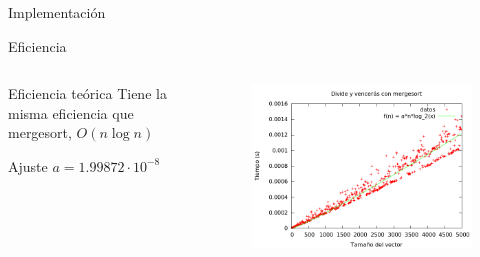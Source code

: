 \begin{frame}{Implementación}

\end{frame}

\begin{frame}{Eficiencia}
\begin{columns}
\begin{column}{5cm}
\begin{block}{Eficiencia teórica}
Tiene la misma eficiencia que mergesort, $O(n\log n)$
\end{block}

\begin{block}{Ajuste}
$a = 1.99872 \cdot 10^{-8}$
\end{block}
\end{column}

\begin{column}{6.5cm}
\begin{figure}[h]
	\centering
	\includegraphics[width=1\textwidth]{../Opcional/Graficas/dyv_mergesort_bruno.png}
\end{figure}
\end{column}
\end{columns}
\end{frame}

